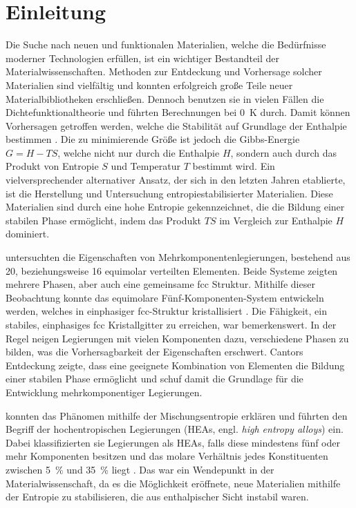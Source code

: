 \section{Einleitung}\label{sec:einleitung}
Die Suche nach neuen und funktionalen Materialien, welche die Bedürfnisse moderner Technologien erfüllen, ist ein
wichtiger Bestandteil der Materialwissenschaften.
Methoden zur Entdeckung und Vorhersage solcher Materialien sind vielfältig und konnten erfolgreich große Teile
neuer Materialbibliotheken erschließen.
Dennoch benutzen sie in vielen Fällen die Dichtefunktionaltheorie und führten Berechnungen bei \qty{0}{\kelvin} durch.
Damit können Vorhersagen getroffen werden, welche die Stabilität auf Grundlage der Enthalpie bestimmen
\autocite{Rost2015}.
Die zu minimierende Größe ist jedoch die Gibbs-Energie $G=H-TS$, welche nicht nur durch die Enthalpie $H$, sondern auch
durch das Produkt von Entropie $S$ und Temperatur $T$ bestimmt wird.
Ein vielversprechender alternativer Ansatz, der sich in den letzten Jahren etablierte, ist die Herstellung und
Untersuchung entropiestabilisierter Materialien.
Diese Materialien sind durch eine hohe Entropie gekennzeichnet, die die Bildung einer stabilen Phase ermöglicht, indem
das Produkt $TS$ im Vergleich zur Enthalpie $H$ dominiert.

 untersuchten die Eigenschaften von Mehrkomponentenlegierungen, bestehend aus 20, beziehungsweise 16
equimolar verteilten Elementen.
Beide Systeme zeigten mehrere Phasen, aber auch eine gemeinsame fcc Struktur.
Mithilfe dieser Beobachtung konnte das equimolare Fünf-Komponenten-System  entwickeln werden, welches in
einphasiger fcc-Struktur kristallisiert \autocite{cantor}.
Die Fähigkeit, ein stabiles, einphasiges fcc Kristallgitter zu erreichen, war bemerkenswert.
In der Regel neigen Legierungen mit vielen Komponenten dazu, verschiedene Phasen zu bilden, was die
Vorhersagbarkeit der Eigenschaften erschwert.
Cantors Entdeckung zeigte, dass eine geeignete Kombination von Elementen die Bildung einer stabilen Phase ermöglicht
und schuf damit die Grundlage für die Entwicklung mehrkomponentiger Legierungen.

 konnten das Phänomen mithilfe der Mischungsentropie erklären und führten den Begriff der
hochentropischen Legierungen (HEAs, engl. \textit{high entropy alloys}) ein.
Dabei klassifizierten sie Legierungen als HEAs, falls diese mindestens fünf oder mehr Komponenten besitzen
und das molare Verhältnis jedes Konstituenten zwischen \qty{5}{\percent} und \qty{35}{\percent} liegt \autocite{yeh}.
Das war ein Wendepunkt in der Materialwissenschaft, da es die Möglichkeit eröffnete, neue Materialien mithilfe
der Entropie zu stabilisieren, die aus enthalpischer Sicht instabil waren.


